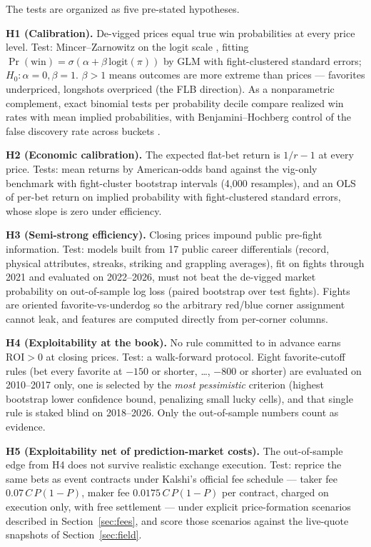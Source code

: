 \documentclass[11pt]{article}
\newcommand{\devig}{de-vigged}
\begin{document}
The tests are organized as five pre-stated hypotheses.

\medskip
\noindent\textbf{H1 (Calibration).} De-vigged prices equal true win probabilities at every price
level. Test: Mincer--Zarnowitz on the logit scale \citep{mincer1969}, fitting
$\Pr(\text{win}) = \sigma\!\left(\alpha + \beta\,\mathrm{logit}(\pi)\right)$ by GLM with
fight-clustered standard errors; $H_0\!: \alpha=0, \beta=1$. $\beta > 1$ means outcomes are more
extreme than prices --- favorites underpriced, longshots overpriced (the FLB direction). As a
nonparametric complement, exact binomial tests per probability decile compare realized win rates
with mean implied probabilities, with Benjamini--Hochberg control of the false discovery rate
across buckets \citep{bh1995}.

\medskip
\noindent\textbf{H2 (Economic calibration).} The expected flat-bet return is $1/r-1$ at every
price. Tests: mean returns by American-odds band against the vig-only benchmark with
fight-cluster bootstrap intervals (4{,}000 resamples), and an OLS of per-bet return on implied
probability with fight-clustered standard errors, whose slope is zero under efficiency.

\medskip
\noindent\textbf{H3 (Semi-strong efficiency).} Closing prices impound public pre-fight
information. Test: models built from 17 public career differentials (record, physical attributes,
streaks, striking and grappling averages), fit on fights through 2021 and evaluated on 2022--2026,
must not beat the \devig{} market probability on out-of-sample log loss (paired bootstrap over
test fights). Fights are oriented favorite-vs-underdog so the arbitrary red/blue corner assignment
cannot leak, and features are computed directly from per-corner columns.

\medskip
\noindent\textbf{H4 (Exploitability at the book).} No rule committed to in advance earns
$\mathrm{ROI}>0$ at closing prices. Test: a walk-forward protocol. Eight favorite-cutoff rules
(bet every favorite at $-150$ or shorter, \dots, $-800$ or shorter) are evaluated on 2010--2017
only, one is selected by the \emph{most pessimistic} criterion (highest bootstrap lower confidence
bound, penalizing small lucky cells), and that single rule is staked blind on 2018--2026. Only the
out-of-sample numbers count as evidence.

\medskip
\noindent\textbf{H5 (Exploitability net of prediction-market costs).} The out-of-sample edge from
H4 does not survive realistic exchange execution. Test: reprice the same bets as event contracts
under Kalshi's official fee schedule \citep{kalshifees} --- taker fee $0.07\,C\,P(1-P)$, maker fee
$0.0175\,C\,P(1-P)$ per contract, charged on execution only, with free settlement --- under
explicit price-formation scenarios described in Section~\ref{sec:fees}, and score those scenarios
against the live-quote snapshots of Section~\ref{sec:field}.
\end{document}
